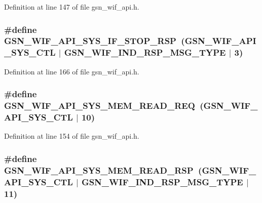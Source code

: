 Definition at line 147 of file gsn\_\-wif\_\-api.h.

\hypertarget{a00606_a1846f96406c429a8ecf8cb1b11c81f71}{
\subsubsection[{GSN\_\-WIF\_\-API\_\-SYS\_\-IF\_\-STOP\_\-RSP}]{\setlength{\rightskip}{0pt plus 5cm}\#define GSN\_\-WIF\_\-API\_\-SYS\_\-IF\_\-STOP\_\-RSP~(GSN\_\-WIF\_\-API\_\-SYS\_\-CTL $|$ GSN\_\-WIF\_\-IND\_\-RSP\_\-MSG\_\-TYPE $|$ 3)}}
\label{a00606_a1846f96406c429a8ecf8cb1b11c81f71}


Definition at line 166 of file gsn\_\-wif\_\-api.h.

\hypertarget{a00606_a3f3fe0223e46a1f2d66ad838b535fb67}{
\subsubsection[{GSN\_\-WIF\_\-API\_\-SYS\_\-MEM\_\-READ\_\-REQ}]{\setlength{\rightskip}{0pt plus 5cm}\#define GSN\_\-WIF\_\-API\_\-SYS\_\-MEM\_\-READ\_\-REQ~(GSN\_\-WIF\_\-API\_\-SYS\_\-CTL $|$ 10)}}
\label{a00606_a3f3fe0223e46a1f2d66ad838b535fb67}


Definition at line 154 of file gsn\_\-wif\_\-api.h.

\hypertarget{a00606_a19bf52f5120153a8453dd90dab2e78b4}{
\subsubsection[{GSN\_\-WIF\_\-API\_\-SYS\_\-MEM\_\-READ\_\-RSP}]{\setlength{\rightskip}{0pt plus 5cm}\#define GSN\_\-WIF\_\-API\_\-SYS\_\-MEM\_\-READ\_\-RSP~(GSN\_\-WIF\_\-API\_\-SYS\_\-CTL $|$ GSN\_\-WIF\_\-IND\_\-RSP\_\-MSG\_\-TYPE $|$ 11)}}
\label{a00606_a19bf52f5120153a8453dd90dab2e78b4}


